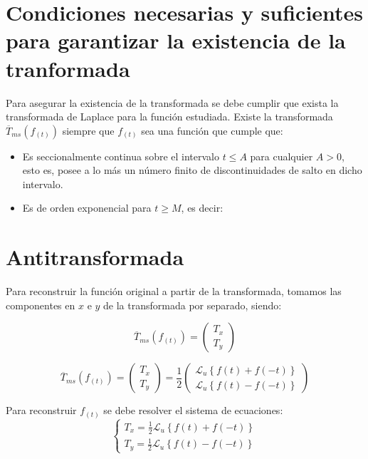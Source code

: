 \documentclass[12pt]{article}
\begin{document}
\section{Condiciones necesarias y suficientes para garantizar la existencia de la tranformada}

Para asegurar la existencia de la transformada se debe cumplir que exista la transformada de Laplace para la función estudiada. Existe la transformada $\overline{T}_{ms}(f_{(t)})$ siempre que $f_{(t)}$ sea una función que cumple que:

\begin{itemize}
\item Es seccionalmente continua sobre el intervalo $t \le A$ para cualquier $A > 0$, esto es, posee a lo más un número finito de discontinuidades de salto en dicho intervalo.
\item Es de orden exponencial para $t \ge M$, es decir:
\end{itemize}


\section{Antitransformada}

Para reconstruir la función original a partir de la transformada, tomamos las componentes en $x$ e $y$ de la transformada por separado, siendo:

$$\overline{T}_{ms}(f_{(t)}) =
\begin{pmatrix}
T_x\\
T_y
\end{pmatrix}
$$


$$\overline{T}_{ms}(f_{(t)}) =
\begin{pmatrix}
T_x\\
T_y
\end{pmatrix} =\frac12
\begin{pmatrix}
\mathcal{L}_u\left\{f(t) + f(-t)\right\}\\[0.2 cm]
\mathcal{L}_u\left\{f(t) -f(-t)\right\}
\end{pmatrix}
$$


Para reconstruir $f_{(t)}$ se debe resolver el sistema de ecuaciones:
$$
\begin{cases}
T_x =\frac12 \mathcal{L}_u\left\{f(t) + f(-t)\right\}\\[0.2 cm]
T_y = \frac12 \mathcal{L}_u\left\{f(t) -f(-t)\right\}
\end{cases}
$$
\end{document}
